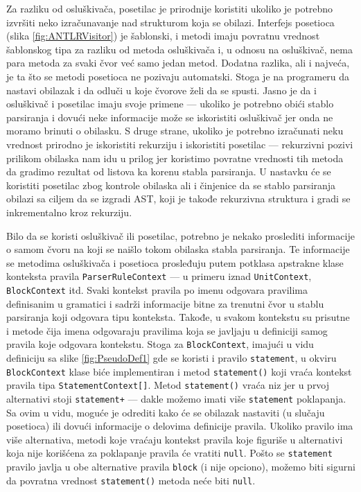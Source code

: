 Za razliku od osluškivača, posetilac je prirodnije koristiti ukoliko je potrebno izvršiti neko izračunavanje nad strukturom koja se obilazi. Interfejs posetioca (slika \ref{fig:ANTLRVisitor}) je šablonski, i metodi imaju povratnu vrednost šablonskog tipa za razliku od metoda osluškivača i, u odnosu na osluškivač, nema para metoda za svaki čvor već samo jedan metod. Dodatna razlika, ali i najveća, je ta što se metodi posetioca ne pozivaju automatski. Stoga je na programeru da nastavi obilazak i da odluči u koje čvorove želi da se spusti. Jasno je da i osluškivač i posetilac imaju svoje primene --- ukoliko je potrebno obići stablo parsiranja i dovući neke informacije može se iskoristiti osluškivač jer onda ne moramo brinuti o obilasku. S druge strane, ukoliko je potrebno izračunati neku vrednost prirodno je iskoristiti rekurziju i iskoristiti posetilac --- rekurzivni pozivi prilikom obilaska nam idu u prilog jer koristimo povratne vrednosti tih metoda da gradimo rezultat od listova ka korenu stabla parsiranja. U nastavku će se koristiti posetilac zbog kontrole obilaska ali i činjenice da se stablo parsiranja obilazi sa ciljem da se izgradi AST, koji je takođe rekurzivna struktura i gradi se inkrementalno kroz rekurziju.

Bilo da se koristi osluškivač ili posetilac, potrebno je nekako proslediti informacije o samom čvoru na koji se naišlo tokom obilaska stabla parsiranja. Te informacije se metodima osluškivača i posetioca prosleđuju putem potklasa apstrakne klase konteksta pravila \texttt{ParserRuleContext} --- u primeru iznad \texttt{UnitContext}, \texttt{BlockContext} itd. Svaki kontekst pravila po imenu odgovara pravilima definisanim u gramatici i sadrži informacije bitne za trenutni čvor u stablu parsiranja koji odgovara tipu konteksta. Takođe, u svakom kontekstu su prisutne i metode čija imena odgovaraju pravilima koja se javljaju u definiciji samog pravila koje odgovara kontekstu. Stoga za \texttt{BlockContext}, imajući u vidu definiciju sa slike \ref{fig:PseudoDef1} gde se koristi i pravilo \texttt{statement}, u okviru \texttt{BlockContext} klase biće implementiran i metod \texttt{statement()} koji vraća kontekst pravila tipa \texttt{StatementContext[]}. Metod \texttt{statement()} vraća niz jer u prvoj alternativi stoji \texttt{statement+} --- dakle možemo imati više \texttt{statement} poklapanja. Sa ovim u vidu, moguće je odrediti kako će se obilazak nastaviti (u slučaju posetioca) ili dovući informacije o delovima definicije pravila. Ukoliko pravilo ima više alternativa, metodi koje vraćaju kontekst pravila koje figuriše u alternativi koja nije korišćena za poklapanje pravila će vratiti \texttt{null}. Pošto se \texttt{statement} pravilo javlja u obe alternative pravila \texttt{block} (i nije opciono), možemo biti sigurni da povratna vrednost \texttt{statement()} metoda neće biti \texttt{null}.
